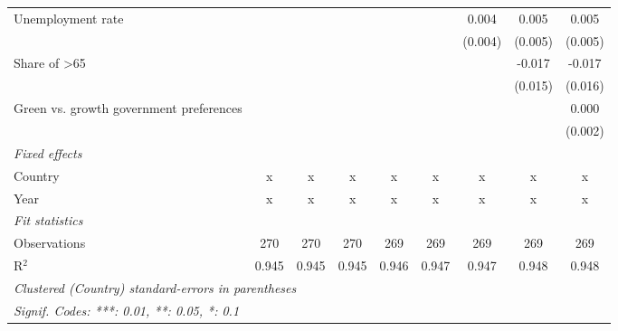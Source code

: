 \begin{table}[htbp]
\begin{tabular}{lcccccccc}
      Unemployment rate                                        &         &         &         &         &         & 0.004   & 0.005   & 0.005\\   
                                                               &         &         &         &         &         & (0.004) & (0.005) & (0.005)\\   
      Share of >65                                             &         &         &         &         &         &         & -0.017  & -0.017\\   
                                                               &         &         &         &         &         &         & (0.015) & (0.016)\\   
      Green vs. growth government preferences                  &         &         &         &         &         &         &         & 0.000\\   
                                                               &         &         &         &         &         &         &         & (0.002)\\   
      \emph{Fixed effects}\\
      Country                                                  & x       & x       & x       & x       & x       & x       & x       & x\\  
      Year                                                     & x       & x       & x       & x       & x       & x       & x       & x\\  
      \midrule \emph{Fit statistics}\\
      Observations                                             & 270     & 270     & 270     & 269     & 269     & 269     & 269     & 269\\  
      R$^2$                                                    & 0.945   & 0.945   & 0.945   & 0.946   & 0.947   & 0.947   & 0.948   & 0.948\\  
      \midrule
      \multicolumn{9}{l}{\emph{Clustered (Country) standard-errors in parentheses}}\\
      \multicolumn{9}{l}{\emph{Signif. Codes: ***: 0.01, **: 0.05, *: 0.1}}\\
   \end{tabular}
\end{table}


